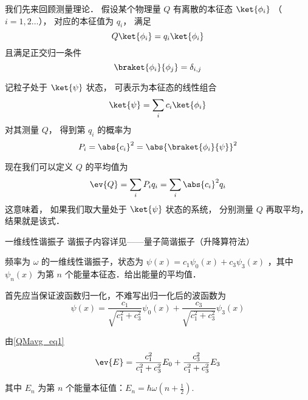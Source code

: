 

我们先来回顾测量理论． 假设某个物理量 $Q$ 有离散的本征态 $\ket{\phi_i}$ （$i = 1,2\dots$）， 对应的本征值为 $q_i$， 满足
\begin{equation}\label{QMavg_eq3}
Q\ket{\phi_i} = q_i \ket{\phi_i}
\end{equation}
且满足正交归一条件
\begin{equation}\label{QMavg_eq4}
\braket{\phi_i}{\phi_j} = \delta_{i,j}
\end{equation}

记粒子处于 $\ket{\psi}$ 状态， 可表示为本征态的线性组合
\begin{equation}\label{QMavg_eq2}
\ket{\psi} = \sum_i c_i \ket{\phi_i}
\end{equation}
对其测量 $Q$， 得到第 $q_i$ 的概率为
\begin{equation}
P_i = \abs{c_i}^2 = \abs{\braket{\phi_i}{\psi}}^2
\end{equation}

现在我们可以定义 $Q$ 的平均值为
\begin{equation}\label{QMavg_eq1}
\ev{Q} = \sum_i P_i q_i = \sum_i\abs{c_i}^2 q_i
\end{equation}
这意味着， 如果我们取大量处于 $\ket{\psi}$ 状态的系统， 分别测量 $Q$ 再取平均， 结果就是该式．

\begin{example}{一维线性谐振子}
谐振子内容详见——量子简谐振子（升降算符法）

频率为 $\omega$ 的一维线性谐振子，状态为 $\psi(x)=c_1 \psi_0(x)+c_3\psi_3(x)$ ，其中 $\psi_n(x)$ 为第 $n$ 个能量本征态．给出能量的平均值．

首先应当保证波函数归一化，不难写出归一化后的波函数为
\begin{equation}
\psi(x)=\frac{c_1}{\sqrt{c_1^2+c_3^2}}\psi_0(x)+\frac{c_3}{\sqrt{c_1^2+c_3^2}}\psi_3(x)
\end{equation}

由\autoref{QMavg_eq1}
\begin{equation}
\ev{E}=\frac{c_1^2}{c_1^2+c_3^2} E_0+\frac{c_3^2}{c_1^2+c_3^2} E_3
\end{equation}

其中 $E_n$ 为第 $n$ 个能量本征值：$E_n=\hbar \omega(n+\frac{1}{2})$.
\end{example}

